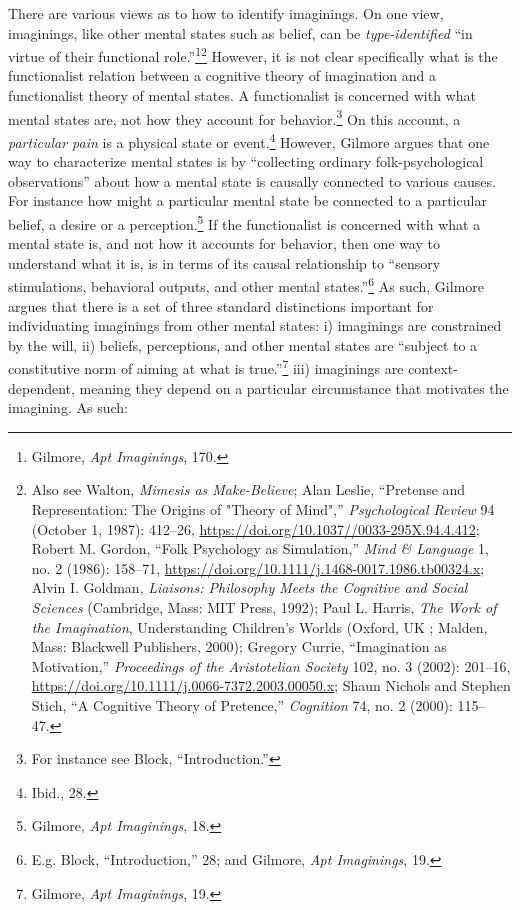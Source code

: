 \documentclass[phdthesis,12pt,final]{wuthesis}
\theoremstyle{definition}
\theoremstyle{definition}
\theoremstyle{definition}
\theoremstyle{definition}
\theoremstyle{remark}
\begin{document}
There are various views as to how to identify imaginings. On one view, imaginings, like other mental states such as belief, can be \emph{type-identified} ``in virtue of their functional role.''\footnote{Gilmore, \emph{Apt {Imaginings}}, 170.}\footnote{Also see Walton, \emph{Mimesis as {Make-Believe}}; Alan Leslie, {``Pretense and {Representation}: {The Origins} of "{Theory} of {Mind}",''} \emph{Psychological Review} 94 (October 1, 1987): 412--26, \url{https://doi.org/10.1037//0033-295X.94.4.412}; Robert M. Gordon, {``Folk Psychology as Simulation,''} \emph{Mind \& Language} 1, no. 2 (1986): 158--71, \url{https://doi.org/10.1111/j.1468-0017.1986.tb00324.x}; Alvin I. Goldman, \emph{Liaisons: Philosophy Meets the Cognitive and Social Sciences} (Cambridge, Mass: MIT Press, 1992); Paul L. Harris, \emph{The {Work} of the {Imagination}}, Understanding {Children}'s {Worlds} (Oxford, UK ; Malden, Mass: Blackwell Publishers, 2000); Gregory Currie, {``Imagination as Motivation,''} \emph{Proceedings of the Aristotelian Society} 102, no. 3 (2002): 201--16, \url{https://doi.org/10.1111/j.0066-7372.2003.00050.x}; Shaun Nichols and Stephen Stich, {``A {Cognitive Theory} of {Pretence},''} \emph{Cognition} 74, no. 2 (2000): 115--47.} However, it is not clear specifically what is the functionalist relation between a cognitive theory of imagination and a functionalist theory of mental states. A functionalist is concerned with what mental states are, not how they account for behavior.\footnote{For instance see Block, {``Introduction.''}} On this account, a \emph{particular pain} is a physical state or event.\footnote{Ibid., 28.} However, Gilmore argues that one way to characterize mental states is by ``collecting ordinary folk-psychological observations'' about how a mental state is causally connected to various causes. For instance how might a particular mental state be connected to a particular belief, a desire or a perception.\footnote{Gilmore, \emph{Apt {Imaginings}}, 18.} If the functionalist is concerned with what a mental state is, and not how it accounts for behavior, then one way to understand what it is, is in terms of its causal relationship to ``sensory stimulations, behavioral outputs, and other mental states.''\footnote{E.g. Block, {``Introduction,''} 28; and Gilmore, \emph{Apt {Imaginings}}, 19.} As such, Gilmore argues that there is a set of three standard distinctions important for individuating imaginings from other mental states: i) imaginings are constrained by the will, ii) beliefs, perceptions, and other mental states are ``subject to a constitutive norm of aiming at what is true.''\footnote{Gilmore, \emph{Apt {Imaginings}}, 19.} iii) imaginings are context-dependent, meaning they depend on a particular circumstance that motivates the imagining. As such:
\end{document}

